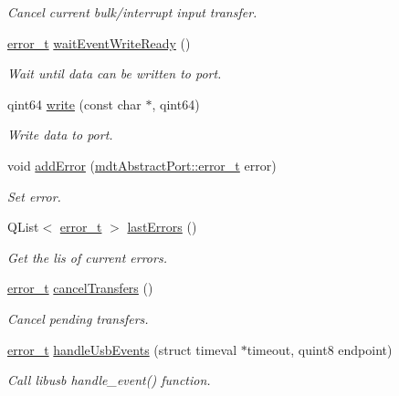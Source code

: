 \begin{DoxyCompactItemize}
\begin{DoxyCompactList}\small\item\em Cancel current bulk/interrupt input transfer. \end{DoxyCompactList}\item 
\hyperlink{classmdt_abstract_port_ad4121bb930c95887e77f8bafa065a85e}{error\_\-t} \hyperlink{classmdt_usb_port_a3be875f6f10ae94fd3a94f925bb935e7}{waitEventWriteReady} ()
\begin{DoxyCompactList}\small\item\em Wait until data can be written to port. \end{DoxyCompactList}\item 
qint64 \hyperlink{classmdt_usb_port_ae777e33325ff2adef326dd7f81b00838}{write} (const char $\ast$, qint64)
\begin{DoxyCompactList}\small\item\em Write data to port. \end{DoxyCompactList}\item 
void \hyperlink{classmdt_usb_port_aa857e94b4167c53b26573042ee3af280}{addError} (\hyperlink{classmdt_abstract_port_ad4121bb930c95887e77f8bafa065a85e}{mdtAbstractPort::error\_\-t} error)
\begin{DoxyCompactList}\small\item\em Set error. \end{DoxyCompactList}\item 
QList$<$ \hyperlink{classmdt_abstract_port_ad4121bb930c95887e77f8bafa065a85e}{error\_\-t} $>$ \hyperlink{classmdt_usb_port_a81855cebd9b672a74d836955236c19bf}{lastErrors} ()
\begin{DoxyCompactList}\small\item\em Get the lis of current errors. \end{DoxyCompactList}\item 
\hyperlink{classmdt_abstract_port_ad4121bb930c95887e77f8bafa065a85e}{error\_\-t} \hyperlink{classmdt_usb_port_afe5b473e1df8b828c17f83a45a3902fb}{cancelTransfers} ()
\begin{DoxyCompactList}\small\item\em Cancel pending transfers. \end{DoxyCompactList}\item 
\hyperlink{classmdt_abstract_port_ad4121bb930c95887e77f8bafa065a85e}{error\_\-t} \hyperlink{classmdt_usb_port_a551748422808cbb071930e1134bfaad5}{handleUsbEvents} (struct timeval $\ast$timeout, quint8 endpoint)
\begin{DoxyCompactList}\small\item\em Call libusb handle\_\-event() function. \end{DoxyCompactList}\item 

\end{DoxyCompactItemize}
